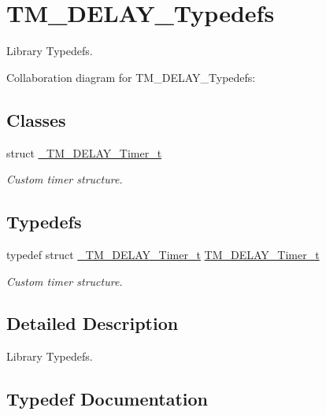 \hypertarget{group___t_m___d_e_l_a_y___typedefs}{}\section{T\+M\+\_\+\+D\+E\+L\+A\+Y\+\_\+\+Typedefs}
\label{group___t_m___d_e_l_a_y___typedefs}


Library Typedefs.  


Collaboration diagram for T\+M\+\_\+\+D\+E\+L\+A\+Y\+\_\+\+Typedefs\+:
\subsection*{Classes}
\begin{DoxyCompactItemize}
\item 
struct \hyperlink{struct___t_m___d_e_l_a_y___timer__t}{\+\_\+\+T\+M\+\_\+\+D\+E\+L\+A\+Y\+\_\+\+Timer\+\_\+t}
\begin{DoxyCompactList}\small\item\em Custom timer structure. \end{DoxyCompactList}\end{DoxyCompactItemize}
\subsection*{Typedefs}
\begin{DoxyCompactItemize}
\item 
typedef struct \hyperlink{struct___t_m___d_e_l_a_y___timer__t}{\+\_\+\+T\+M\+\_\+\+D\+E\+L\+A\+Y\+\_\+\+Timer\+\_\+t} \hyperlink{group___t_m___d_e_l_a_y___typedefs_gaf0beeb077a757f34c8b176464d9a0e85}{T\+M\+\_\+\+D\+E\+L\+A\+Y\+\_\+\+Timer\+\_\+t}
\begin{DoxyCompactList}\small\item\em Custom timer structure. \end{DoxyCompactList}\end{DoxyCompactItemize}


\subsection{Detailed Description}
Library Typedefs. 



\subsection{Typedef Documentation}
\mbox{\label{group___t_m___d_e_l_a_y___typedefs_gaf0beeb077a757f34c8b176464d9a0e85}} 
